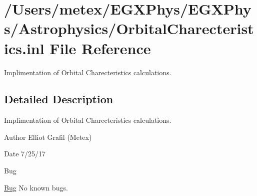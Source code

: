 \hypertarget{_orbital_charecteristics_8inl}{}\section{/\+Users/metex/\+E\+G\+X\+Phys/\+E\+G\+X\+Phys/\+Astrophysics/\+Orbital\+Charecteristics.inl File Reference}
\label{_orbital_charecteristics_8inl}


Implimentation of Orbital Charecteristics calculations.  




\subsection{Detailed Description}
Implimentation of Orbital Charecteristics calculations. 

\begin{DoxyAuthor}{Author}
Elliot Grafil (Metex) 
\end{DoxyAuthor}
\begin{DoxyDate}{Date}
7/25/17 
\end{DoxyDate}
\begin{DoxyRefDesc}{Bug}
\item[\hyperlink{bug__bug000012}{Bug}]No known bugs. \end{DoxyRefDesc}

